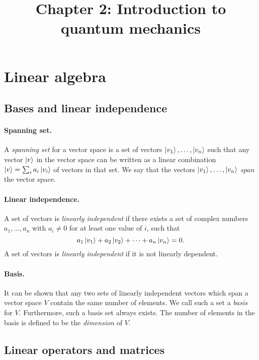 \documentclass{article}
\begin{document}
\title{Chapter 2: Introduction to quantum mechanics}
\maketitle

\section{Linear algebra}

\subsection{Bases and linear independence}

\paragraph{Spanning set.} A \emph{spanning set} for a vector space is a set of
vectors $\ket{v_1}, \ldots, \ket{v_n}$ such that any vector $\ket{v}$ in the
vector space can be written as a linear combination $\ket{v} = \sum_i a_i
\ket{v_i}$ of vectors in that set. We say that the vectors $\ket{v_1}, \ldots,
\ket{v_n}$ \emph{span} the vector space.

\paragraph{Linear independence.} A set of vectors is \emph{linearly
independent} if there exists a set of complex numbers $a_1, \ldots, a_n$ with
$a_i \neq 0$ for at least one value of $i$, such that \begin{equation}
  a_1\ket{v_1} + a_2\ket{v_2} + \cdots + a_n\ket{v_n} = 0. \label{eq:lin-ind}
\end{equation} A set of vectors is \emph{linearly independent} if it is not
linearly dependent.

\paragraph{Basis.} It can be shown that any two sets of linearly independent
vectors which span a vector space $V$ contain the same number of elements. We
call such a set a \emph{basis} for $V$. Furthermore, such a basis set always
exists. The number of elements in the basis is defined to be the
\emph{dimension} of $V$.

\subsection{Linear operators and matrices}
\end{document}
